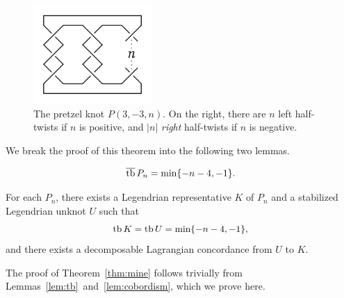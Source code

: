 \begin{figure}[ht!]
    \centering
    \includegraphics[width=0.4\textwidth]{images/pretzel-knot.pdf}
    \caption{The pretzel knot $P(3, -3, n)$. On the right, there are $n$ left half-twists if $n$ is positive, and $|n|$ \emph{right} half-twists if $n$ is negative.}
    \label{fig:pretzel-knot}
\end{figure}

We break the proof of this theorem into the following two lemmas.
\begin{lemma}\label{lem:tb}
    \[
        \overline{\operatorname{tb}}\, P_n = \min \{ -n-4, -1\}.
    \]
\end{lemma}

\begin{lemma}\label{lem:cobordism}
    For each $P_n$, there exists a Legendrian representative $K$ of $P_n$ and a stabilized Legendrian unknot $U$ such that 
    \[
        \operatorname{tb} K = \operatorname{tb} U = \min \{-n-4, -1\},
    \]
    and there exists a decomposable Lagrangian concordance from $U$ to $K$.
\end{lemma}

The proof of Theorem~\ref{thm:mine} follows trivially from Lemmas~\ref{lem:tb}~and~\ref{lem:cobordism}, which we prove here.

